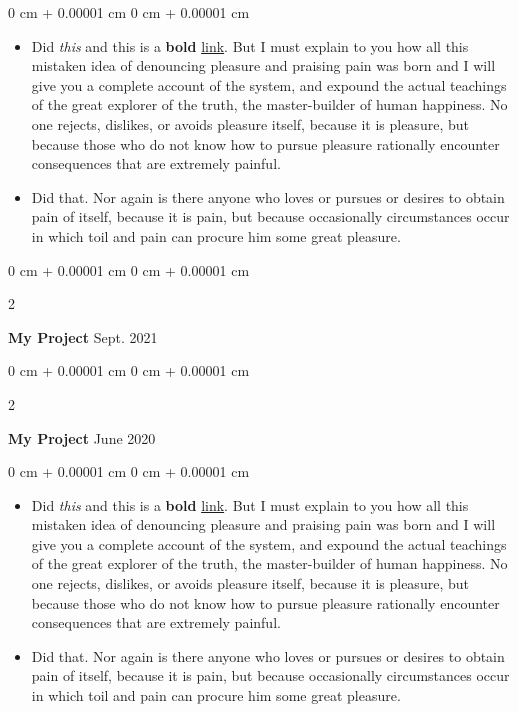 \documentclass[10pt, letterpaper]{article}
\newenvironment{highlights}{
    \begin{itemize}[
        topsep=0.10 cm,
        parsep=0.10 cm,
        partopsep=0pt,
        itemsep=0pt,
        leftmargin=0 cm + 10pt
    ]
}{
    \end{itemize}
} %
\newenvironment{onecolentry}{
    \begin{adjustwidth}{
        0 cm + 0.00001 cm
    }{
        0 cm + 0.00001 cm
    }
}{
    \end{adjustwidth}
} %
\newenvironment{twocolentry}[2][]{
    \onecolentry
    \def\secondColumn{#2}
    \setcolumnwidth{\fill, 4.5 cm}
    \begin{paracol}{2}
}{
    \switchcolumn \raggedleft \secondColumn
    \end{paracol}
    \endonecolentry
} %
\begin{document}
        \vspace{0.10 cm}
        \begin{onecolentry}
            \begin{highlights}
                \item Did \textit{this} and this is a \textbf{bold} \href{https://example.com}{link}. But I must explain to you how all this mistaken idea of denouncing pleasure and praising pain was born and I will give you a complete account of the system, and expound the actual teachings of the great explorer of the truth, the master-builder of human happiness. No one rejects, dislikes, or avoids pleasure itself, because it is pleasure, but because those who do not know how to pursue pleasure rationally encounter consequences that are extremely painful.
                \item Did that. Nor again is there anyone who loves or pursues or desires to obtain pain of itself, because it is pain, but because occasionally circumstances occur in which toil and pain can procure him some great pleasure.
            \end{highlights}
        \end{onecolentry}


        \vspace{0.2 cm}

        \begin{twocolentry}{
            Sept. 2021
        }
            \textbf{My Project}\end{twocolentry}



        \vspace{0.2 cm}

        \begin{twocolentry}{
            June 2020
        }
            \textbf{My Project}\end{twocolentry}

        \vspace{0.10 cm}
        \begin{onecolentry}
            \begin{highlights}
                \item Did \textit{this} and this is a \textbf{bold} \href{https://example.com}{link}. But I must explain to you how all this mistaken idea of denouncing pleasure and praising pain was born and I will give you a complete account of the system, and expound the actual teachings of the great explorer of the truth, the master-builder of human happiness. No one rejects, dislikes, or avoids pleasure itself, because it is pleasure, but because those who do not know how to pursue pleasure rationally encounter consequences that are extremely painful.
                \item Did that. Nor again is there anyone who loves or pursues or desires to obtain pain of itself, because it is pain, but because occasionally circumstances occur in which toil and pain can procure him some great pleasure.
            \end{highlights}
        \end{onecolentry}
\end{document}
